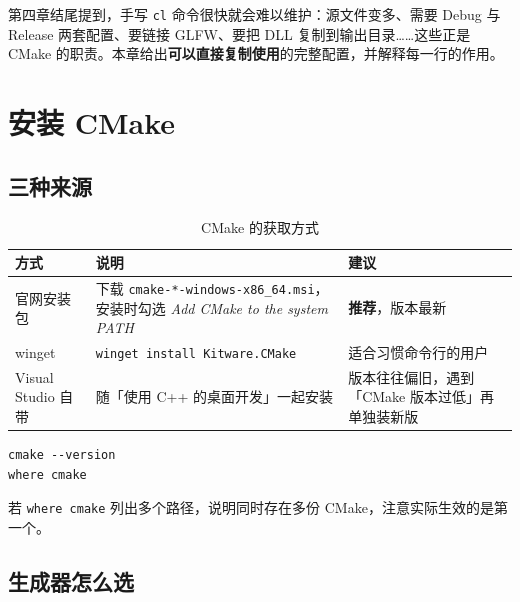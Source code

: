 
第四章结尾提到，手写 \texttt{cl} 命令很快就会难以维护：源文件变多、需要 Debug 与 Release 两套配置、要链接 GLFW、要把 DLL 复制到输出目录……这些正是 CMake 的职责。本章给出\textbf{可以直接复制使用}的完整配置，并解释每一行的作用。

\section{安装 CMake}

\subsection{三种来源}

\begin{table}[H]
	\centering
	\caption{CMake 的获取方式}
	\label{tab:CMake:安装}
	\footnotesize
	\begin{tabular}{>{\raggedright\arraybackslash}p{3.0cm}>{\raggedright\arraybackslash}p{5.6cm}>{\raggedright\arraybackslash}p{5.4cm}}
		\hline
		方式 & 说明 & 建议 \\
		\hline
		官网安装包 & 下载 \texttt{cmake-*-windows-x86\_64.msi}，安装时勾选 \textit{Add CMake to the system PATH} & \textbf{推荐}，版本最新 \\
		winget & \texttt{winget install Kitware.CMake} & 适合习惯命令行的用户 \\
		Visual Studio 自带 & 随「使用 C++ 的桌面开发」一起安装 & 版本往往偏旧，遇到「CMake 版本过低」再单独装新版 \\
		\hline
	\end{tabular}
\end{table}

\begin{lstlisting}[style=shell]
cmake --version
where cmake
\end{lstlisting}

若 \texttt{where cmake} 列出多个路径，说明同时存在多份 CMake，注意实际生效的是第一个。

\subsection{生成器怎么选}

